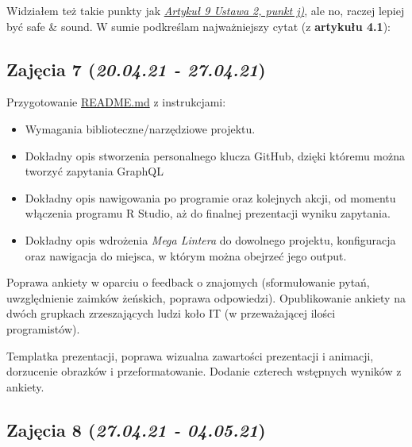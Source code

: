 \documentclass[graybox]{svmult}
\begin{document}
Widziałem też takie punkty jak \hyperlink{https://gdpr.pl/baza-wiedzy/akty-prawne/interaktywny-tekst-gdpr/artykul-9-przetwarzanie-szczegolnych-kategorii-danych-osobowych}{\emph{Artykuł 9 Ustawa 2, punkt j)}}, ale no, raczej lepiej być safe \& sound. W sumie podkreślam najważniejszy cytat (z \textbf{artykułu 4.1}):


\subsection{Zajęcia 7 (\emph{20.04.21 - 27.04.21})}

Przygotowanie \href{https://github.com/pwr-pbr21/M1/commit/34a82a756464be4957f9512095e1a7ced9c700f6}{README.md} z instrukcjami:

\begin{itemize}
  \item Wymagania biblioteczne/narzędziowe projektu.
  \item Dokładny opis stworzenia personalnego klucza GitHub, dzięki któremu można tworzyć zapytania GraphQL
  \item Dokładny opis nawigowania po programie oraz kolejnych akcji, od momentu włączenia programu R Studio, aż do finalnej prezentacji wyniku zapytania.
  \item Dokładny opis wdrożenia \emph{Mega Lintera} do dowolnego projektu, konfiguracja oraz nawigacja do miejsca, w którym można obejrzeć jego output.
\end{itemize}

Poprawa ankiety w oparciu o feedback o znajomych (sformułowanie pytań, uwzględnienie zaimków żeńskich, poprawa odpowiedzi). Opublikowanie ankiety na dwóch grupkach zrzeszających ludzi koło IT (w przeważającej ilości programistów). 

Templatka prezentacji, poprawa wizualna zawartości prezentacji i animacji, dorzucenie obrazków i przeformatowanie. Dodanie czterech wstępnych wyników z ankiety.

\subsection{Zajęcia 8 (\emph{27.04.21 - 04.05.21})}
\end{document}
